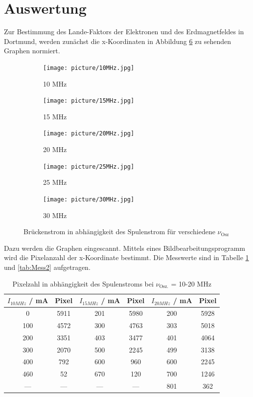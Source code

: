 \section{Auswertung}
\label{sec:Auswertung}
Zur Bestimmung des Lande-Faktors der Elektronen und des Erdmagnetfeldes in Dortmund, werden zunächst die x-Koordinaten in Abbildung \ref{fig:Skizze} zu sehenden Graphen normiert.
\begin{figure}
  \centering
  \begin{subfigure}[b]{0.49\textwidth}
     \texttt{[image: picture/10MHz.jpg]}
     \caption{10 MHz}
     \label{fig:10Skiz}
  \end{subfigure}
  \begin{subfigure}[b]{0.49\textwidth}
     \texttt{[image: picture/15MHz.jpg]}
     \caption{15 MHz}
     \label{fig:15Skiz}
  \end{subfigure}
  \begin{subfigure}[b]{0.49\textwidth}
     \texttt{[image: picture/20MHz.jpg]}
     \caption{20 MHz}
     \label{fig:20Skiz}
  \end{subfigure}
  \begin{subfigure}[b]{0.49\textwidth}
     \texttt{[image: picture/25MHz.jpg]}
     \caption{25 MHz}
     \label{fig:25Skiz}
  \end{subfigure}
  \begin{subfigure}[b]{0.49\textwidth}
     \texttt{[image: picture/30MHz.jpg]}
     \caption{30 MHz}
     \label{fig:30Skiz}
  \end{subfigure}
  \caption{Brückenstrom in abhängigkeit des Spulenstrom für verschiedene $\nu_\text{Osz}$}
  \label{fig:Skizze}
\end{figure}
Dazu werden die Graphen eingescannt. Mittels eines Bildbearbeitungsprogramm wird die Pixelanzahl der x-Koordinate bestimmt. Die Messwerte sind in Tabelle \ref{tab:Mess1} und \ref{tab:Mess2} aufgetragen. 
\begin{table}
  \centering
  \caption{Pixelzahl in abhängigkeit des Spulenstroms bei $\nu_\text{Osz.}$ = 10-20 MHz}
  \begin{tabular}{c c|c c|c c}
    \toprule
    	$I_{10 MHz}$ / mA & Pixel & $I_{15MHz}$ / mA & Pixel & $I_{20MHz}$ / mA & Pixel \\    
    \midrule
	0   & 5911 & 201 & 5980 & 200 & 5928 \\
	100 & 4572 & 300 & 4763 & 303 & 5018 \\
	200 & 3351 & 403 & 3477 & 401 & 4064 \\
	300 & 2070 & 500 & 2245 & 499 & 3138 \\
	400 & 792  & 600 & 960  & 600 & 2245 \\
	460 & 52   & 670 & 120  & 700 & 1246 \\
	--- & ---  & --- & ---  & 801 & 362  \\
    \bottomrule 
  \end{tabular}
  \label{tab:Mess1}
\end{table}
